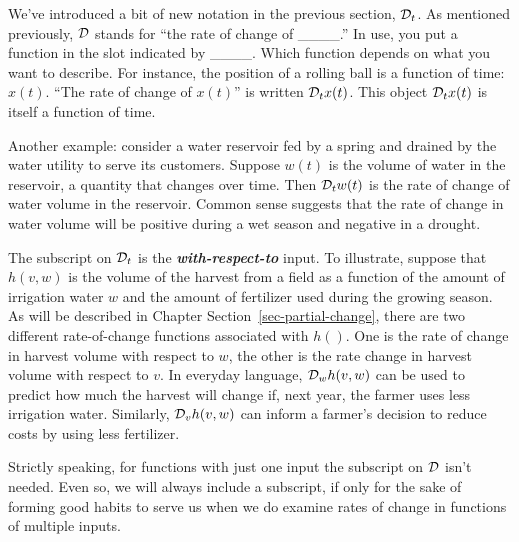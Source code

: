 \documentclass[
  letterpaper,
  DIV=11,
  numbers=noendperiod,
  oneside]{scrreprt}
\begin{document}
We've introduced a bit of new notation in the previous section,
\({\cal D}_t\). {} As mentioned
previously, \({\cal D}\) stands for ``the rate of change of \_\_\_\_.''
In use, you put a function in the slot indicated by \_\_\_\_. Which
function depends on what you want to describe. For instance, the
position of a rolling ball is a function of time: \(x(t)\). ``The rate
of change of \(x(t)\)'' is written \({\cal D}_t x(t)\). This object
\({\cal D}_t x(t)\) is itself a function of time.

Another example: consider a water reservoir fed by a spring and drained
by the water utility to serve its customers. Suppose \(w(t)\) is the
volume of water in the reservoir, a quantity that changes over time.
Then \({\cal D}_t w(t)\) is the rate of change of water volume in the
reservoir. Common sense suggests that the rate of change in water volume
will be positive during a wet season and negative in a drought.

The subscript on \({\cal D}_t\) is the \textbf{\emph{with-respect-to}}
input. To illustrate, suppose that \(h(v, w)\) is the volume of the
harvest from a field as a function of the amount of irrigation water
\(w\) and the amount of fertilizer used during the growing season.
{} As
will be described in Chapter Section~\ref{sec-partial-change}, there are
two different rate-of-change functions associated with \(h()\). One is
the rate of change in harvest volume with respect to \(w\), the other is
the rate change in harvest volume with respect to \(v\). In everyday
language, \({\cal D}_w h(v, w)\) can be used to predict how much the
harvest will change if, next year, the farmer uses less irrigation
water. Similarly, \({\cal D}_v h(v, w)\) can inform a farmer's decision
to reduce costs by using less fertilizer.

Strictly speaking, for functions with just one input the subscript on
\({\cal D}\) isn't needed. Even so, we will always include a subscript,
if only for the sake of forming good habits to serve us when we do
examine rates of change in functions of multiple inputs.
\end{document}
